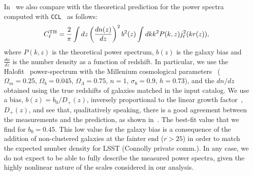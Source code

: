\documentclass[a4paper,fleqn,usenatbib]{mnras}
\begin{document}
In~ we also compare with the theoretical prediction for the power spectra computed with \texttt{CCL}~\citep{2019ApJS..242....2C} as follows:
\begin{equation}
C_{\ell}^{\rm TH} = \frac{2}{\pi}\int{dz} \left(\frac{dn(z)}{dz}\right)^{2} b^{2}(z) \int{dk k^{2} P(k,z)j^{2}_{\ell}(kr(z))},
\end{equation}
where $P(k,z)$ is the theoretical power spectrum, $b(z)$ is the galaxy bias and $\frac{dn}{dz}$ is the number density as a function of redshift. In particular, we use the Halofit~\citep{2012ApJ...761..152T} power-spectrum with the Millenium cosmological parameters~\citep{2005Nature.435.629S} ($\Omega_{m}=0.25$, $\Omega_{b}=0.045$, $\Omega_{\Lambda}=0.75$, $n=1$, $\sigma_{8}=0.9$, $h=0.73$), and the $dn/dz$ obtained using the true redshifts of galaxies matched in the input catalog. We use a bias, $b(z) = b_{0}/D_{+}(z)$, inversely proportional to the linear growth factor~\citep{1980lssu.book.....P}, $D_{+}(z)$, and see that, qualitatively speaking, there is a good agreement between the measurements and the prediction, as shown in~. The best-fit value that we find for $b_{0}=0.45$. This low value for the galaxy bias is a consequence of the addition of non-clustered galaxies at the fainter end ($r > 25$) in order to match the expected number density for LSST (Connolly private comm.). 
In any case, we do not expect to be able to fully describe the measured power spectra, given the highly nonlinear nature of the scales considered in our analysis.
\end{document}

